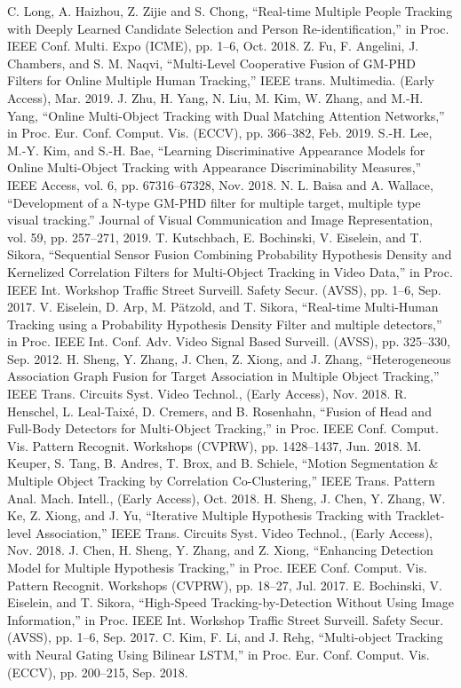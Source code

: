 \documentclass[journal]{IEEEtran}
\newcounter{ct}
\begin{document}
\begin{thebibliography}{00}
 C. Long, A. Haizhou, Z. Zijie and S. Chong, ``Real-time Multiple People Tracking with Deeply Learned Candidate Selection and Person Re-identification,'' in Proc. IEEE Conf. Multi. Expo (ICME), pp. 1--6, Oct. 2018.
Z. Fu, F. Angelini, J. Chambers, and S. M. Naqvi, ``Multi-Level Cooperative Fusion of GM-PHD Filters for Online Multiple Human Tracking,'' IEEE trans. Multimedia. (Early Access), Mar. 2019.
J. Zhu, H. Yang, N. Liu, M. Kim, W. Zhang, and M.-H. Yang, ``Online Multi-Object Tracking with Dual Matching Attention Networks,'' in Proc. Eur. Conf. Comput. Vis. (ECCV), pp. 366--382, Feb. 2019.
S.-H. Lee, M.-Y. Kim, and S.-H. Bae, ``Learning Discriminative Appearance Models for Online Multi-Object Tracking with Appearance Discriminability Measures,'' IEEE Access, vol. 6, pp. 67316--67328, Nov. 2018.
N. L. Baisa and A. Wallace, ``Development of a N-type GM-PHD filter for multiple target, multiple type visual tracking.'' Journal of Visual Communication and Image Representation, vol. 59, pp. 257--271, 2019.
T. Kutschbach, E. Bochinski, V. Eiselein, and T. Sikora, ``Sequential Sensor Fusion Combining Probability Hypothesis Density and Kernelized Correlation Filters for Multi-Object Tracking in Video Data,'' in Proc. IEEE Int. Workshop Traffic Street Surveill. Safety Secur. (AVSS), pp. 1--6, Sep. 2017.
V. Eiselein, D. Arp, M. P\"atzold, and T. Sikora, ``Real-time Multi-Human Tracking using a Probability Hypothesis Density Filter and multiple detectors,'' in Proc. IEEE Int. Conf. Adv. Video Signal Based Surveill. (AVSS), pp. 325--330, Sep. 2012.
 H. Sheng, Y. Zhang, J. Chen, Z. Xiong, and J. Zhang, ``Heterogeneous Association Graph Fusion for Target Association in Multiple Object Tracking,'' IEEE Trans. Circuits Syst. Video Technol., (Early Access), Nov. 2018.
R. Henschel, L. Leal-Taix\'e, D. Cremers, and B. Rosenhahn, ``Fusion of Head and Full-Body Detectors for Multi-Object Tracking,'' in Proc. IEEE Conf. Comput. Vis. Pattern Recognit. Workshops (CVPRW), pp. 1428--1437, Jun. 2018.
 M. Keuper, S. Tang, B. Andres, T. Brox, and B. Schiele, ``Motion Segmentation \& Multiple Object Tracking by Correlation Co-Clustering,'' IEEE Trans. Pattern Anal. Mach. Intell., (Early Access), Oct. 2018.
H. Sheng, J. Chen, Y. Zhang, W. Ke, Z. Xiong, and J. Yu, ``Iterative Multiple Hypothesis Tracking with Tracklet-level Association,'' IEEE Trans. Circuits Syst. Video Technol., (Early Access), Nov. 2018.
 J. Chen, H. Sheng, Y. Zhang, and Z. Xiong, ``Enhancing Detection Model for Multiple Hypothesis Tracking,'' in Proc. IEEE Conf. Comput. Vis. Pattern Recognit. Workshops (CVPRW), pp. 18--27, Jul. 2017.
E. Bochinski, V. Eiselein, and T. Sikora, ``High-Speed Tracking-by-Detection Without Using Image Information,'' in Proc. IEEE Int. Workshop Traffic Street Surveill. Safety Secur. (AVSS), pp. 1--6, Sep. 2017.
 C. Kim, F. Li, and J. Rehg, ``Multi-object Tracking with Neural Gating Using Bilinear LSTM,'' in Proc. Eur. Conf. Comput. Vis. (ECCV), pp. 200--215, Sep. 2018.


\end{thebibliography}
\end{document}

